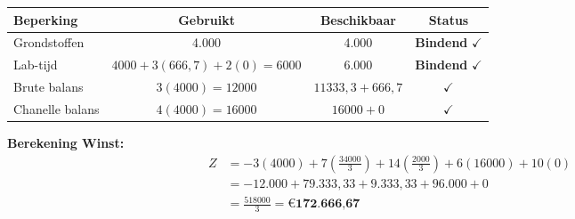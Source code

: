 \documentclass[a4paper,11pt]{article}
\begin{document}
\begin{oefenblok}
    \begin{center}
        \begin{tabular}{|l|c|c|c|}
            \hline
            \textbf{Beperking} & \textbf{Gebruikt}                & \textbf{Beschikbaar}   & \textbf{Status}               \\
            \hline
            Grondstoffen       & 4.000                            & 4.000                  & \textbf{Bindend} $\checkmark$ \\
            \hline
            Lab-tijd           & $4000 + 3(666{,}7) + 2(0) = 6000$ & 6.000                  & \textbf{Bindend} $\checkmark$ \\
            \hline
            Brute balans       & $3(4000) = 12000$                & $11333{,}3 + 666{,}7$ & $\checkmark$                  \\
            \hline
            Chanelle balans    & $4(4000) = 16000$                & $16000 + 0$            & $\checkmark$                  \\
            \hline
        \end{tabular}
    \end{center}

    \textbf{Berekening Winst:}
    \begin{align*}
        Z & = -3(4000) + 7\left(\tfrac{34000}{3}\right) + 14\left(\tfrac{2000}{3}\right) + 6(16000) + 10(0) \\
          & = -12.000 + 79.333{,}33 + 9.333{,}33 + 96.000 + 0                                                   \\
          & = \tfrac{518000}{3} = \textbf{€172.666,67}
    \end{align*}

    \begin{center}
    \end{center}

\end{oefenblok}
\end{document}
